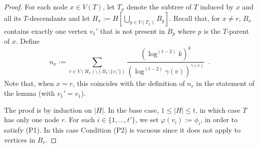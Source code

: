 \documentclass[kpfonts]{patmorin}
\theoremstyle{named}
\begin{document}
\begin{proof}
    For each node $x\in V(T)$, let $T_x$ denote the subtree of $T$ induced by $x$ and all its $T$-descendants and let $H_x:=H[\bigcup_{y\in V(T_x)} B_y]$. Recall that, for $x\neq r$, $B_x$ contains exactly one vertex $v_1'$ that is not present in $B_p$ where $p$ is the $T$-parent of $x$.  Define
    \[
        n_x:=\sum_{v\in V(H_x)\setminus (B_x\setminus \{v_1'\})}\frac{(\log^{(t-2)} k)^k}{(\log^{(t-2)}\gamma(v))^{\gamma(v)}} \enspace .
    \]
    Note that, when $x=r$, this coincides with the definition of $n_r$ in the statement of the lemma (with $v_1'=v_1$).

    The proof is by induction on $|H|$.  In the base case, $1\le|H|\le t$, in which case $T$ has only one node $r$. For each $i\in\{1,\ldots,t'\}$, we set $\varphi(v_i):=\phi_i$, in order to satisfy (P1).  In this case Condition (P2) is vacuous since it does not apply to vertices in $B_r$.


\end{proof}
\end{document}

